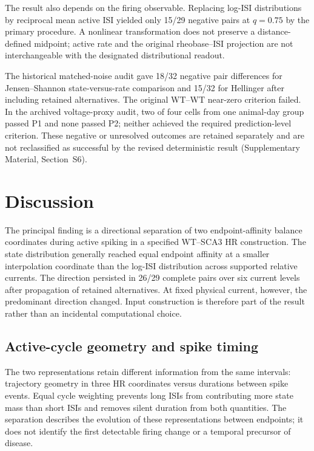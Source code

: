 \documentclass[utf8]{FrontiersinHarvard}
\newcommand{\sref}[1]{Supplementary Material, Section~#1}
\begin{document}
The result also depends on the firing observable. Replacing log-ISI distributions by reciprocal mean active ISI yielded only 15/29 negative pairs at $q=0.75$ by the primary procedure. A nonlinear transformation does not preserve a distance-defined midpoint; active rate and the original rheobase--ISI projection are not interchangeable with the designated distributional readout.

The historical matched-noise audit gave 18/32 negative pair differences for Jensen--Shannon state-versus-rate comparison and 15/32 for Hellinger after including retained alternatives. The original WT--WT near-zero criterion failed. In the archived voltage-proxy audit, two of four cells from one animal-day group passed P1 and none passed P2; neither achieved the required prediction-level criterion. These negative or unresolved outcomes are retained separately and are not reclassified as successful by the revised deterministic result (\sref{S6}).

\section{Discussion}\label{sec:discussion}
The principal finding is a directional separation of two endpoint-affinity balance coordinates during active spiking in a specified WT--SCA3 HR construction. The state distribution generally reached equal endpoint affinity at a smaller interpolation coordinate than the log-ISI distribution across supported relative currents. The direction persisted in 26/29 complete pairs over six current levels after propagation of retained alternatives. At fixed physical current, however, the predominant direction changed. Input construction is therefore part of the result rather than an incidental computational choice.

\subsection{Active-cycle geometry and spike timing}
The two representations retain different information from the same intervals: trajectory geometry in three HR coordinates versus durations between spike events. Equal cycle weighting prevents long ISIs from contributing more state mass than short ISIs and removes silent duration from both quantities. The separation describes the evolution of these representations between endpoints; it does not identify the first detectable firing change or a temporal precursor of disease.
\end{document}
